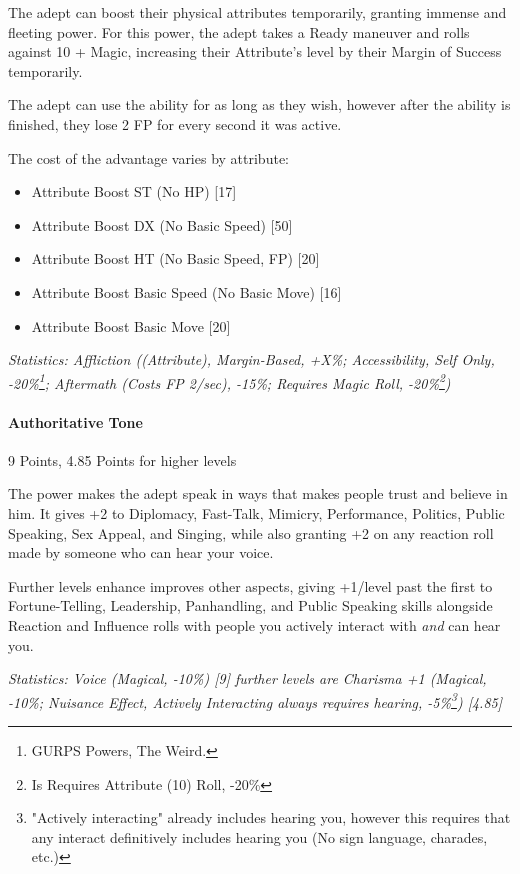 \begin{multicols*}{3}
	The adept can boost their physical attributes temporarily, granting immense and fleeting power. For this power, the adept takes a Ready maneuver and rolls against 10 + Magic, increasing their Attribute's level by their Margin of Success temporarily. 
	
	The adept can use the ability for as long as they wish, however after the ability is finished, they lose 2 FP for every second it was active.
	
	The cost of the advantage varies by attribute:
	
	\begin{itemize}
		\itemsep 0pt
		\item Attribute Boost ST (No HP) [17]
		\item Attribute Boost DX (No Basic Speed) [50]
		\item Attribute Boost HT (No Basic Speed, FP) [20]
		\item Attribute Boost Basic Speed (No Basic Move) [16]
		\item Attribute Boost Basic Move [20]
	\end{itemize}
	
	\textcolor{OliveGreen}{\textit{Statistics: Affliction ((Attribute), Margin-Based, +X\%; Accessibility, Self Only, -20\%\footnote{GURPS Powers, The Weird.}; Aftermath (Costs FP 2/sec), -15\%; Requires Magic Roll, -20\%\footnote{Is Requires Attribute (10) Roll, -20\%}) }}
	
	\paragraph{Authoritative Tone}
	\begin{flushright}
		9 Points, 4.85 Points for higher levels
	\end{flushright}
			
	The power makes the adept speak in ways that makes people trust and believe in him. It gives +2 to Diplomacy, Fast-Talk, Mimicry, Performance, Politics, Public Speaking, Sex Appeal, and Singing, while also granting +2 on any reaction roll made by someone who can hear your voice.
	
	Further levels enhance improves other aspects, giving +1/level past the first to Fortune-Telling, Leadership, Panhandling, and Public Speaking skills alongside Reaction and Influence rolls with people you actively interact with \textit{and} can hear you.
			
	\textcolor{OliveGreen}{\textit{Statistics: Voice (Magical, -10\%) [9] further levels are Charisma +1 (Magical, -10\%; Nuisance Effect, Actively Interacting always requires hearing, -5\%\footnote{"Actively interacting" already includes hearing you, however this requires that any interact definitively includes hearing you (No sign language, charades, etc.)}) [4.85]}}
			

\end{multicols*}
